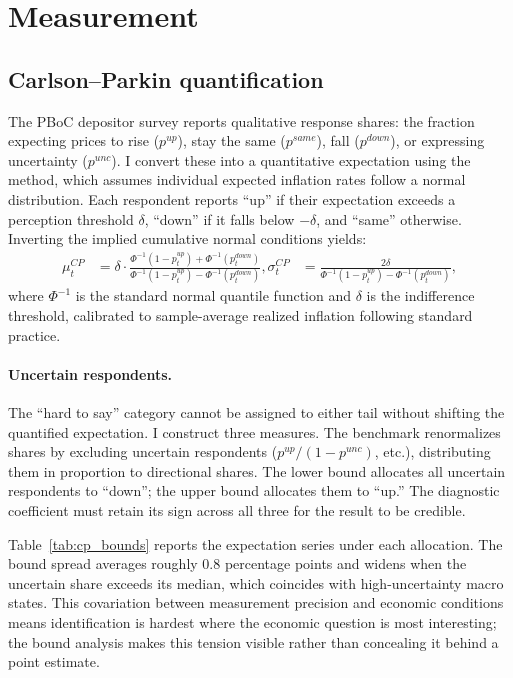 \section{Measurement}%

\subsection{Carlson--Parkin quantification}

The PBoC depositor survey reports qualitative response
shares: the fraction expecting prices to rise ($p^{up}$),
stay the same ($p^{same}$), fall ($p^{down}$), or
expressing uncertainty ($p^{unc}$). I convert these into
a quantitative expectation using the \citet{Carlson1975}
method, which assumes individual expected inflation rates
follow a normal distribution. Each respondent reports
``up'' if their expectation exceeds a perception threshold
$\delta$, ``down'' if it falls below $-\delta$, and
``same'' otherwise. Inverting the implied cumulative
normal conditions yields:
\begin{align*}
  \mu_t^{CP} &= \delta \cdot
    \frac{\Phi^{-1}(1 - p_t^{up}) +
          \Phi^{-1}(p_t^{down})}
         {\Phi^{-1}(1 - p_t^{up}) -
          \Phi^{-1}(p_t^{down})}, %
  \sigma_t^{CP} &= \frac{2\delta}
    {\Phi^{-1}(1 - p_t^{up}) -
     \Phi^{-1}(p_t^{down})}, %
\end{align*}
where $\Phi^{-1}$ is the standard normal quantile function
and $\delta$ is the indifference threshold, calibrated to
sample-average realized inflation following standard
practice.

\paragraph{Uncertain respondents.}
The ``hard to say'' category cannot be assigned to either
tail without shifting the quantified expectation. I
construct three measures. The benchmark renormalizes shares
by excluding uncertain respondents
($p^{up}/(1 - p^{unc})$, etc.), distributing them in
proportion to directional shares. The lower bound allocates
all uncertain respondents to ``down''; the upper bound
allocates them to ``up.'' The diagnostic coefficient must
retain its sign across all three for the result to be
credible.

Table~\ref{tab:cp_bounds} reports the expectation series
under each allocation. The bound spread averages roughly
0.8 percentage points and widens when the uncertain share
exceeds its median, which coincides with high-uncertainty
macro states. This covariation between measurement
precision and economic conditions means identification is
hardest where the economic question is most interesting;
the bound analysis makes this tension visible rather than
concealing it behind a point estimate.


